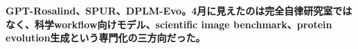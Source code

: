 \noindent\textbf{GPT-Rosalind、SPUR、DPLM-Evo。4月に見えたのは完全自律研究室ではなく、科学workflow向けモデル、scientific image benchmark、protein evolution生成という専門化の三方向だった。}\autocite{src-078f0d540d88,src-7ae707d75c4b,src-f0bb84fcd319}
